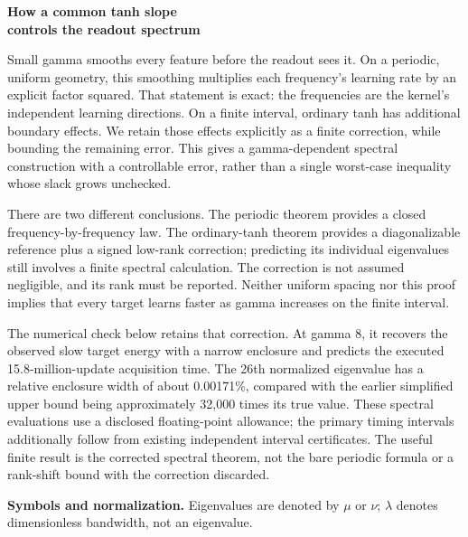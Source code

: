 \documentclass[11pt]{article}
\theoremstyle{definition}
\begin{document}
\thispagestyle{plain}
{\color{ink}\fontsize{23}{26}\selectfont\bfseries How a common tanh slope\\controls the readout spectrum\par}
\vspace{8pt}
Small gamma smooths every feature before the readout sees it. On a periodic,
uniform geometry, this smoothing multiplies each frequency's learning rate
by an explicit factor squared. That statement is exact: the frequencies are
the kernel's independent learning directions. On a finite interval, ordinary
tanh has additional boundary effects. We retain those effects explicitly as
a finite correction, while bounding the remaining error. This gives a
gamma-dependent spectral construction with a controllable error, rather than
a single worst-case inequality whose slack grows unchecked.

There are two different conclusions. The periodic theorem provides a closed
frequency-by-frequency law. The ordinary-tanh theorem provides a diagonalizable
reference plus a signed low-rank correction; predicting its individual
eigenvalues still involves a finite spectral calculation. The correction is
not assumed negligible, and its rank must be reported. Neither uniform spacing
nor this proof implies that every target learns faster as gamma increases on
the finite interval.

The numerical check below retains that correction. At gamma 8, it recovers
the observed slow target energy with a narrow enclosure and predicts the
executed 15.8-million-update acquisition time. The 26th normalized eigenvalue
has a relative enclosure width of about 0.00171\%, compared with the earlier
simplified upper bound being approximately 32,000 times its true value.
These spectral evaluations use a disclosed floating-point allowance; the
primary timing intervals additionally follow from existing independent
interval certificates. The useful finite result is the corrected spectral
theorem, not the bare periodic formula or a rank-shift bound with the
correction discarded.

\textbf{Symbols and normalization.} Eigenvalues are denoted by $\mu$ or $\nu$;
$\lambda$ denotes dimensionless bandwidth, not an eigenvalue.
\end{document}
